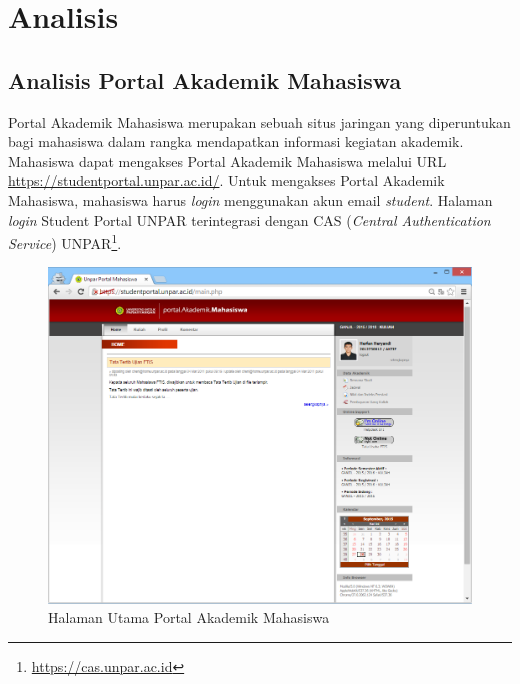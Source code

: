 \chapter{Analisis}
\label{chap:analisis}

\section{Analisis Portal Akademik Mahasiswa}
Portal Akademik Mahasiswa merupakan sebuah situs jaringan yang diperuntukan bagi mahasiswa dalam rangka mendapatkan informasi kegiatan akademik\cite{BTI:2012}. Mahasiswa dapat mengakses Portal Akademik Mahasiswa melalui URL \url{https://studentportal.unpar.ac.id/}. Untuk mengakses Portal Akademik Mahasiswa, mahasiswa harus \textit{login} menggunakan akun email \textit{student}. Halaman \textit{login} Student Portal UNPAR terintegrasi dengan CAS (\textit{Central Authentication Service}) UNPAR\footnote{\url{https://cas.unpar.ac.id}}.

\begin{figure}[H]
	\centering
	\includegraphics[scale=0.5]{Gambar/pam-home}
	\caption{Halaman Utama Portal Akademik Mahasiswa} 
	\label{fig:3_pam_home}
\end{figure}

